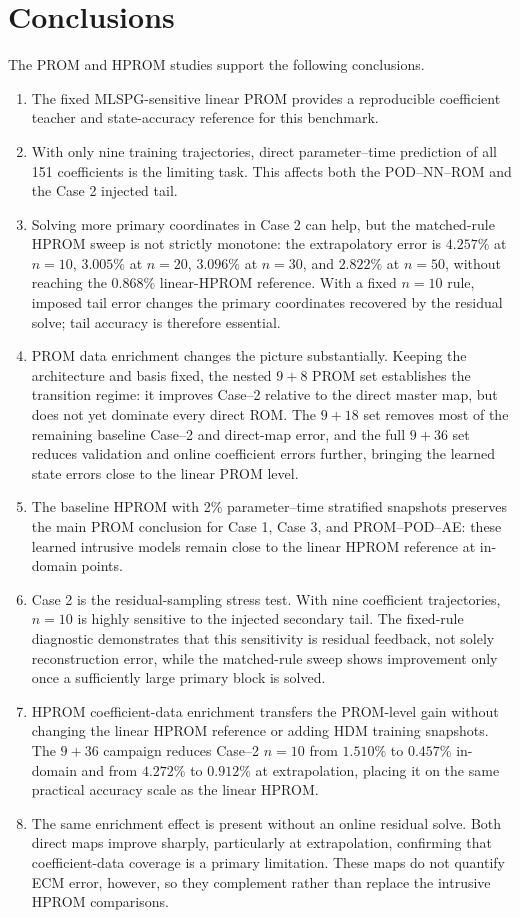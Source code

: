 \documentclass[11pt]{article}
\begin{document}
\section{Conclusions}
The PROM and HPROM studies support the following conclusions.
\begin{enumerate}
  \item The fixed MLSPG-sensitive linear PROM provides a reproducible coefficient teacher and state-accuracy
  reference for this benchmark.
  \item With only nine training trajectories, direct parameter--time prediction of all 151 coefficients is the
  limiting task.  This affects both the POD--NN--ROM and the Case 2 injected tail.
  \item Solving more primary coordinates in Case 2 can help, but the matched-rule HPROM sweep is not strictly
  monotone: the extrapolatory error is $4.257\%$ at $n=10$, $3.005\%$ at $n=20$, $3.096\%$ at $n=30$, and $2.822\%$
  at $n=50$, without reaching the $0.868\%$ linear-HPROM reference.  With a fixed $n=10$ rule, imposed tail error
  changes the primary coordinates recovered by the residual solve; tail accuracy is therefore essential.
  \item PROM data enrichment changes the picture substantially.  Keeping the architecture and basis fixed, the
  nested $9+8$ PROM set establishes the transition regime: it improves Case--2 relative to the direct master map,
  but does not yet dominate every direct ROM.  The $9+18$ set removes most of the remaining baseline Case--2 and
  direct-map error, and the full $9+36$ set reduces validation and online coefficient errors further, bringing the
  learned state errors close to the linear PROM level.
  \item The baseline HPROM with 2\% parameter--time stratified snapshots preserves the main PROM conclusion for
  Case 1, Case 3, and PROM--POD--AE: these learned intrusive models remain close to the linear HPROM reference at
  in-domain points.
  \item Case 2 is the residual-sampling stress test.  With nine coefficient trajectories, \(n=10\) is highly
  sensitive to the injected secondary tail.  The fixed-rule diagnostic demonstrates that this sensitivity is
  residual feedback, not solely reconstruction error, while the matched-rule sweep shows improvement only once
  a sufficiently large primary block is solved.
  \item HPROM coefficient-data enrichment transfers the PROM-level gain without changing the linear HPROM reference
  or adding HDM training snapshots.  The \(9+36\) campaign reduces Case--2 \(n=10\) from \(1.510\%\) to \(0.457\%\)
  in-domain and from \(4.272\%\) to \(0.912\%\) at extrapolation, placing it on the same practical accuracy scale as
  the linear HPROM.
  \item The same enrichment effect is present without an online residual solve.  Both direct maps improve sharply,
  particularly at extrapolation, confirming that coefficient-data coverage is a primary limitation.  These maps do
  not quantify ECM error, however, so they complement rather than replace the intrusive HPROM comparisons.
\end{enumerate}
\end{document}
